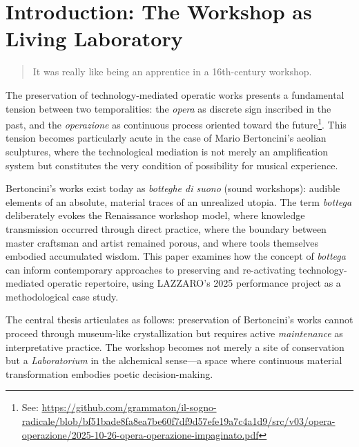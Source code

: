 
\section{Introduction: The Workshop as Living Laboratory}

\begin{quote}
  \begin{sf}
    \small
    It was really like being an apprentice in a 16th-century workshop. \cite{nottoli2019}
  \end{sf}
\end{quote}

The preservation of technology-mediated operatic works presents a fundamental 
tension between two temporalities: the \emph{opera} as discrete sign inscribed 
in the past, and the \emph{operazione} as continuous process oriented toward 
the future\footnote{See: 
\url{https://github.com/grammaton/il-sogno-radicale/blob/bf51bade8fa8ea7be60f7df9d57efe19a7c4a1d9/src/v03/opera-operazione/2025-10-26-opera-operazione-impaginato.pdf}}.
This tension becomes particularly acute in the case of Mario Bertoncini's 
aeolian sculptures, where the technological mediation is not merely an 
amplification system but constitutes the very condition of possibility for 
musical experience.

Bertoncini's works exist today as \emph{botteghe di suono} (sound workshops): 
audible elements of an absolute, material traces of an unrealized utopia. The 
term \emph{bottega} deliberately evokes the Renaissance workshop model, where 
knowledge transmission occurred through direct practice, where the boundary 
between master craftsman and artist remained porous, and where tools themselves 
embodied accumulated wisdom. This paper examines how the concept of 
\emph{bottega} can inform contemporary approaches to preserving and 
re-activating technology-mediated operatic repertoire, using LAZZARO's 
2025 performance project as a methodological case study.

The central thesis articulates as follows: preservation of Bertoncini's works 
cannot proceed through museum-like crystallization but requires active 
\emph{maintenance} as interpretative practice. The workshop becomes not merely 
a site of conservation but a \emph{Laboratorium} in the alchemical sense---a 
space where continuous material transformation embodies poetic decision-making.

